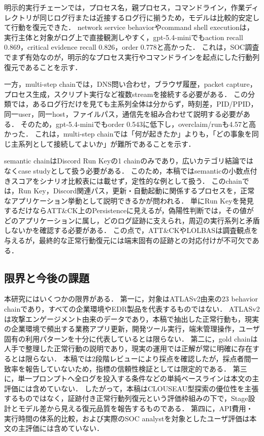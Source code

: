 \documentclass[a4paper,twocolumn,10pt]{article}
\newcommand{\code}[1]{{\small\ttfamily #1}}
\begin{document}
明示的実行チェーンでは，プロセス名，親プロセス，コマンドライン，作業ディレクトリが同じログ行または近接するログ行に揃うため，モデルは比較的安定して行動を復元できた．
network service behaviorやcommand shell executionは，実行主体と対象がログ上で直接観測しやすく，\code{gpt-5.4-mini}でもaction recall 0.869，critical evidence recall 0.826，order 0.778と高かった．
これは，SOC調査でまず有効なのが，明示的なプロセス実行やコマンドラインを起点にした行動列復元であることを示す．

一方，multi-step chainでは，DNS問い合わせ，ブラウザ履歴，packet capture，プロセス生成，スクリプト実行など複数streamを接続する必要がある．
この分類では，あるログ行だけを見ても主系列全体は分からず，時刻差，PID/PPID，同一user，同一host，ファイルパス，通信先を組み合わせて説明する必要がある．
そのため，\code{gpt-5.4-mini}でもorder 0.543に低下し，overclaim/runも4.57と高かった．
これは，multi-step chainでは「何が起きたか」よりも，「どの事象を同じ主系列として接続してよいか」が難所であることを示す．

semantic chainはDiscord Run Keyの1 chainのみであり，広いカテゴリ結論ではなくcase studyとして扱う必要がある．
このため，本稿ではsemanticの小数点付きスコアをシナリオ比較表には載せず，定性的な例として扱う．
このchainでは，Run Key，Discord関連パス，更新・自動起動に関係するプロセスを，正常なアプリケーション挙動として説明できるかが問われる．
単にRun Keyを発見するだけならATT\&CK上のPersistenceに見えるが，偽陽性判断では，その値がどのアプリケーションに属し，どのログ証跡に支えられ，周辺の実行系列と矛盾しないかを確認する必要がある．
この点で，ATT\&CKやLOLBASは調査観点を与えるが，最終的な正常行動復元には端末固有の証跡との対応付けが不可欠である．

\subsection{限界と今後の課題}

本研究にはいくつかの限界がある．
第一に，対象はATLASv2由来の23 behavior chainであり，すべての企業環境やEDR製品を代表するものではない．
ATLASv2は攻撃エンゲージメント由来のデータであり，本稿で抽出した正常行動も，現実の企業環境で頻出する業務アプリ更新，開発ツール実行，端末管理操作，ユーザ固有の利用パターンを十分に代表しているとは限らない．
第二に，gold chainは人手で整理した正常行動の説明であり，現実の運用では正解が常に明確に存在するとは限らない．
本稿では2段階レビューにより採点を確認したが，採点者間一致率を報告していないため，指標の信頼性検証としては限定的である．
第三に，単一プロンプトへ全ログを投入する条件などの単純ベースラインは本文の主評価には含めていない．
したがって，本稿はCLOUSEAU型探索の優位性を主張するものではなく，証跡付き正常行動列復元という評価枠組みの下で，Stage設計とモデル差から見える復元品質を報告するものである．
第四に，API費用・実行時間の体系的比較，および実際のSOC analystを対象としたユーザ評価は本文の主評価には含めていない．
\end{document}
